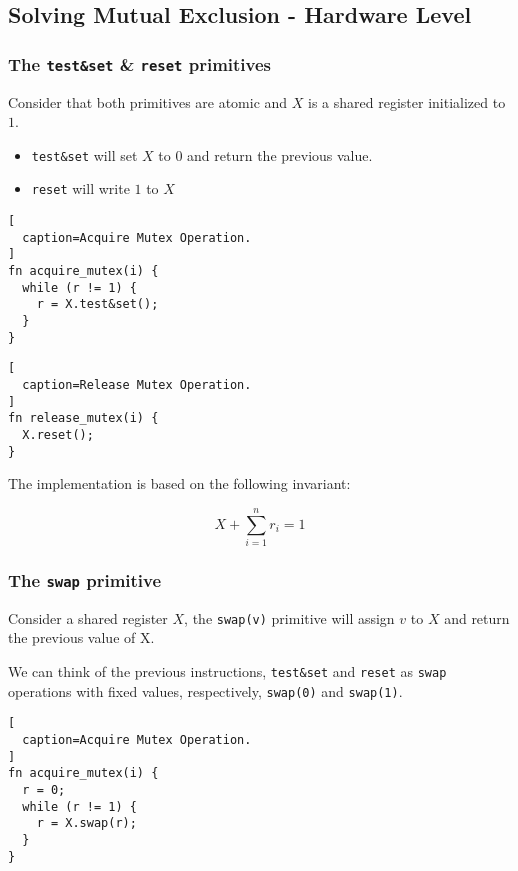 \subsection{Solving Mutual Exclusion - Hardware Level}

\subsubsection{The \texttt{test\&set} \& \texttt{reset} primitives}

Consider that both primitives are atomic and $X$ is a shared register initialized to $1$.
\begin{itemize}
    \item \texttt{test\&set} will set $X$ to $0$ and return the previous value.
    \item \texttt{reset} will write $1$ to $X$
\end{itemize}

\begin{lstlisting}[
  caption=Acquire Mutex Operation.
]
fn acquire_mutex(i) {
  while (r != 1) {
    r = X.test&set();
  }
}
\end{lstlisting}

\begin{lstlisting}[
  caption=Release Mutex Operation.
]
fn release_mutex(i) {
  X.reset();
}
\end{lstlisting}

The implementation is based on the following invariant:

\begin{equation*}
    X + \sum_{i=1}^{n} r_i = 1
\end{equation*}

\subsubsection{The \texttt{swap} primitive}

Consider a shared register $X$,
the \texttt{swap(v)} primitive will assign $v$ to $X$
and return the previous value of X.

We can think of the previous instructions,
\texttt{test\&set} and \texttt{reset} as \texttt{swap} operations with fixed values,
respectively, \texttt{swap(0)} and \texttt{swap(1)}.

\begin{lstlisting}[
  caption=Acquire Mutex Operation.
]
fn acquire_mutex(i) {
  r = 0;
  while (r != 1) {
    r = X.swap(r);
  }
}
\end{lstlisting}

